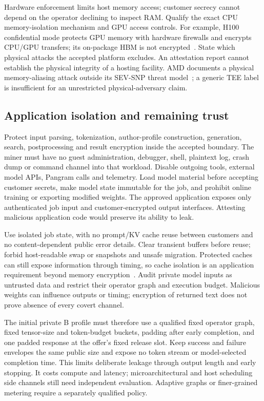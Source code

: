 Hardware enforcement limits host memory access; customer secrecy cannot
depend on the operator declining to inspect RAM. Qualify the exact CPU
memory-isolation mechanism and GPU access controls. For example, H100
confidential mode protects GPU memory with hardware firewalls and encrypts
CPU/GPU transfers; its on-package HBM is not encrypted~\cite{h100isolation}.
State which physical attacks the accepted platform excludes. An
attestation report cannot establish the physical integrity of a hosting
facility. AMD documents a physical memory-aliasing attack outside its
SEV-SNP threat model~\cite{amdphysical}; a generic TEE label is insufficient
for an unrestricted physical-adversary claim.

\subsection{Application isolation and remaining trust}\label{attested-isolation}

Protect input parsing, tokenization, author-profile construction,
generation, search, postprocessing and result encryption inside the
accepted boundary. The miner must have no guest administration, debugger,
shell, plaintext log, crash dump or command channel into that workload.
Disable outgoing tools, external model APIs, Pangram calls and telemetry.
Load model material before accepting customer secrets, make model state
immutable for the job, and prohibit online training or exporting modified
weights. The approved application exposes only authenticated job input
and customer-encrypted output interfaces. Attesting malicious application
code would preserve its ability to leak.

Use isolated job state, with no prompt/KV cache reuse between customers
and no content-dependent public error details. Clear transient buffers
before reuse; forbid host-readable swap or snapshots and unsafe migration.
Protected caches can still expose information through timing, so cache
isolation is an application requirement beyond memory
encryption~\cite{privatecache}. Audit private model inputs as untrusted
data and restrict their operator graph and execution budget. Malicious
weights can influence outputs or timing; encryption of returned text
does not prove absence of every covert channel.

The initial private B profile must therefore use a qualified fixed
operator graph, fixed tensor-size and token-budget buckets, padding after
early completion, and one padded response at the offer's fixed release
slot. Keep success and failure envelopes the same public size and expose
no token stream or model-selected completion time. This limits deliberate
leakage through output length and early stopping. It costs compute and
latency; microarchitectural and host scheduling side channels still need
independent evaluation. Adaptive graphs or finer-grained metering require
a separately qualified policy.

